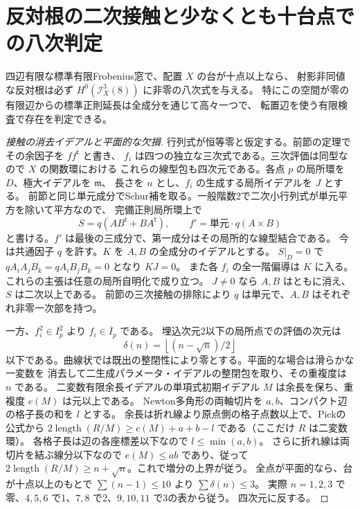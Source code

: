 \section{反対根の二次接触と少なくとも十台点での八次判定}
\label{sec:opposite-contact-support}
\begin{theorem}\label{thm:opposite-contact-support}
四辺有限な標準有限Frobenius窓で、配置 $X$ の台が十点以上なら、
射影非同値な反対根は必ず $H^0(\mathcal I_X^3(8))$ に非零の八次式を与える。
特にこの空間が零の有限辺からの標準正則延長は全成分を通じて高々一つで、
転置辺を使う有限検査で存在を判定できる。
\end{theorem}

\begin{proof}[接触の消去イデアルと平面的な欠損]
行列式が恒等零と仮定する。前節の定理でその余因子を $ff^{\mathsf t}$ と書き、
$f_i$ は四つの独立な三次式である。三次評価は同型なので $X$ の関数環における
これらの線型包も四次元である。各点 $p$ の局所環を $D$、極大イデアルを $\mathfrak m$、
長さを $n$ とし、$f_i$ の生成する局所イデアルを $J$ とする。
前節と同じ単元成分でSchur補を取る。一般階数2で二次小行列式が単元平方を除いて平方なので、
完備正則局所環上で
\[
           S=q(A B^{\mathsf t}+B A^{\mathsf t}),\qquad
           f'=\text{単元}\cdot q(A\times B)
\]
と書ける。$f'$ は最後の三成分で、第一成分はその局所的な線型結合である。
今は共通因子 $q$ を許す。$K$ を $A,B$ の全成分のイデアルとする。
$S|_D=0$ で $q A_iA_jB_k=q A_iB_jB_k=0$ となり $KJ=0$。
また各 $f_i$ の全一階偏導は $K$ に入る。これらの主張は任意の局所自明化で成り立つ。
$J\ne0$ なら $A,B$ はともに消え、$S$ は二次以上である。
前節の三次接触の排除により $q$ は単元で、$A,B$ はそれぞれ非零一次部を持つ。

一方、$f_i^2\in I_p^2$ より $f_i\in\overline I_p$ である。
埋込次元2以下の局所点での評価の次元は
\[
       \delta(n)=\left\lfloor (n-\sqrt n)/2\right\rfloor
\]
以下である。曲線状では既出の整閉性により零とする。平面的な場合は滑らかな一変数を
消去して二生成パラメータ・イデアルの整閉包を取り、その重複度は $n$ である。
二変数有限余長イデアルの単項式初期イデアル $M$ は余長を保ち、重複度 $e(M)$ は元以上である。
Newton多角形の両軸切片を $a,b$、コンパクト辺の格子長の和を $l$ とする。
余長は折れ線より原点側の格子点数以上で、Pickの公式から
$2\operatorname{length}(R/M)\ge e(M)+a+b-l$ である（ここだけ $R$ は二変数環）。
各格子長は辺の各座標差以下なので $l\le\min(a,b)$。
さらに折れ線は両切片を結ぶ線分以下なので $e(M)\le ab$ であり、従って
$2\operatorname{length}(R/M)\ge n+\sqrt n$。これで増分の上界が従う。
全点が平面的なら、台が十点以上のもとで $\sum(n-1)\le10$ より $\sum\delta(n)\le3$。
実際 $n=1,2,3$ で零、$4,5,6$ で1、$7,8$ で2、$9,10,11$ で3の表から従う。
四次元に反する。
\end{proof}

